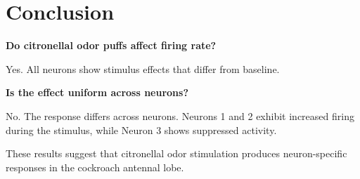 \documentclass[11pt]{article}
\begin{document}
\section*{Conclusion}

\noindent \textbf{Do citronellal odor puffs affect firing rate?}

\noindent Yes. All neurons show stimulus effects that differ from baseline.

\smallskip

\noindent \textbf{Is the effect uniform across neurons?}

\smallskip

\noindent No. The response differs across neurons. Neurons 1 and 2 exhibit
increased firing during the stimulus, while Neuron 3 shows suppressed
activity.

\smallskip

\noindent These results suggest that citronellal odor stimulation produces
neuron-specific responses in the cockroach antennal lobe.
\end{document}
